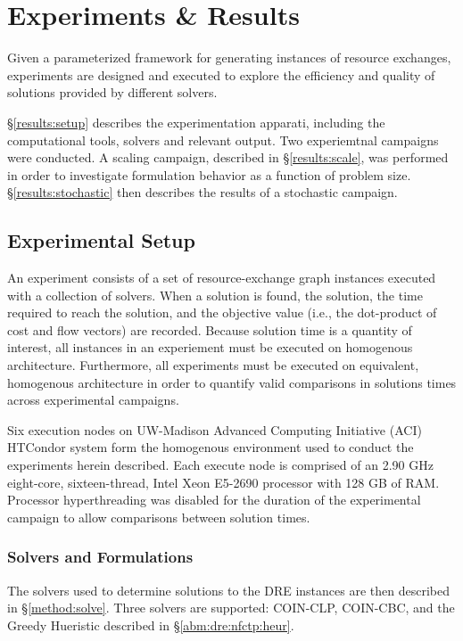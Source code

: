 \chapter{Experiments \& Results}\label{ch:results}

Given a parameterized framework for generating instances of resource exchanges,
experiments are designed and executed to explore the efficiency and quality of
solutions provided by different solvers. 

\S \ref{results:setup} describes the experimentation apparati, including the
computational tools, solvers and relevant output. Two experiemtnal campaigns
were conducted. A scaling campaign, described in \S \ref{results:scale}, was
performed in order to investigate formulation behavior as a function of problem
size. \S \ref {results:stochastic} then describes the results of a stochastic
campaign.

\section{Experimental Setup}

An experiment consists of a set of resource-exchange graph instances executed
with a collection of solvers. When a solution is found, the solution, the time
required to reach the solution, and the objective value (i.e., the dot-product
of cost and flow vectors) are recorded. Because solution time is a quantity of
interest, all instances in an experiement must be executed on homogenous
architecture. Furthermore, all experiments must be executed on equivalent,
homogenous architecture in order to quantify valid comparisons in solutions
times across experimental campaigns.

Six execution nodes on UW-Madison Advanced Computing Initiative (ACI) HTCondor
system form the homogenous environment used to conduct the experiments herein
described. Each execute node is comprised of an 2.90 GHz eight-core,
sixteen-thread, Intel Xeon E5-2690 \cite{intelproc} processor with 128 GB of
RAM. Processor hyperthreading was disabled for the duration of the experimental
campaign to allow comparisons between solution times.

\subsection{Solvers and Formulations}

The solvers used to determine solutions to the DRE instances are then described
in \S \ref{method:solve}. Three solvers are supported: COIN-CLP, COIN-CBC, and
the Greedy Hueristic described in \S \ref{abm:dre:nfctp:heur}.

